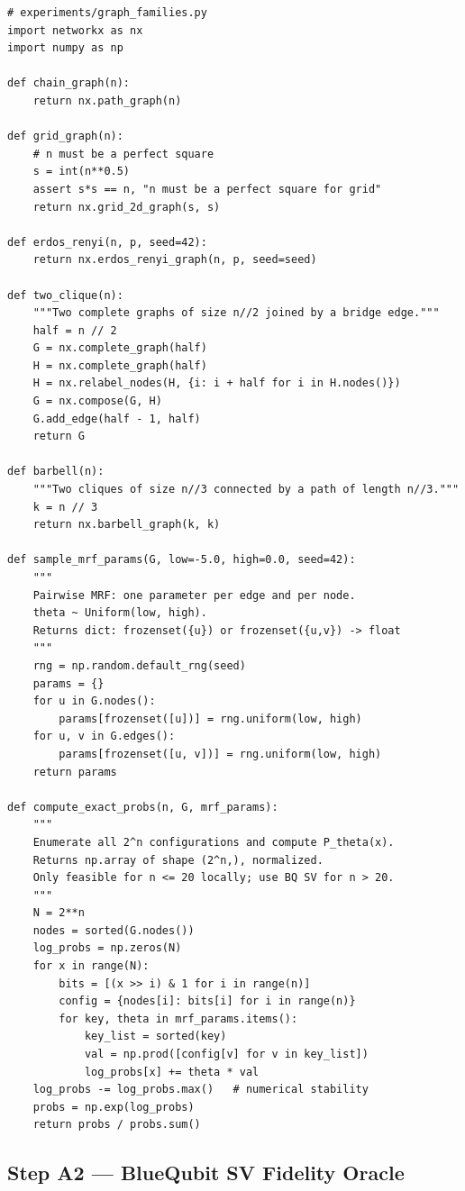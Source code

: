\documentclass[11pt]{article}
\begin{document}
\begin{lstlisting}
# experiments/graph_families.py
import networkx as nx
import numpy as np

def chain_graph(n):
    return nx.path_graph(n)

def grid_graph(n):
    # n must be a perfect square
    s = int(n**0.5)
    assert s*s == n, "n must be a perfect square for grid"
    return nx.grid_2d_graph(s, s)

def erdos_renyi(n, p, seed=42):
    return nx.erdos_renyi_graph(n, p, seed=seed)

def two_clique(n):
    """Two complete graphs of size n//2 joined by a bridge edge."""
    half = n // 2
    G = nx.complete_graph(half)
    H = nx.complete_graph(half)
    H = nx.relabel_nodes(H, {i: i + half for i in H.nodes()})
    G = nx.compose(G, H)
    G.add_edge(half - 1, half)
    return G

def barbell(n):
    """Two cliques of size n//3 connected by a path of length n//3."""
    k = n // 3
    return nx.barbell_graph(k, k)

def sample_mrf_params(G, low=-5.0, high=0.0, seed=42):
    """
    Pairwise MRF: one parameter per edge and per node.
    theta ~ Uniform(low, high).
    Returns dict: frozenset({u}) or frozenset({u,v}) -> float
    """
    rng = np.random.default_rng(seed)
    params = {}
    for u in G.nodes():
        params[frozenset([u])] = rng.uniform(low, high)
    for u, v in G.edges():
        params[frozenset([u, v])] = rng.uniform(low, high)
    return params

def compute_exact_probs(n, G, mrf_params):
    """
    Enumerate all 2^n configurations and compute P_theta(x).
    Returns np.array of shape (2^n,), normalized.
    Only feasible for n <= 20 locally; use BQ SV for n > 20.
    """
    N = 2**n
    nodes = sorted(G.nodes())
    log_probs = np.zeros(N)
    for x in range(N):
        bits = [(x >> i) & 1 for i in range(n)]
        config = {nodes[i]: bits[i] for i in range(n)}
        for key, theta in mrf_params.items():
            key_list = sorted(key)
            val = np.prod([config[v] for v in key_list])
            log_probs[x] += theta * val
    log_probs -= log_probs.max()   # numerical stability
    probs = np.exp(log_probs)
    return probs / probs.sum()
\end{lstlisting}

\subsection{Step A2 --- BlueQubit SV Fidelity Oracle}
\end{document}
